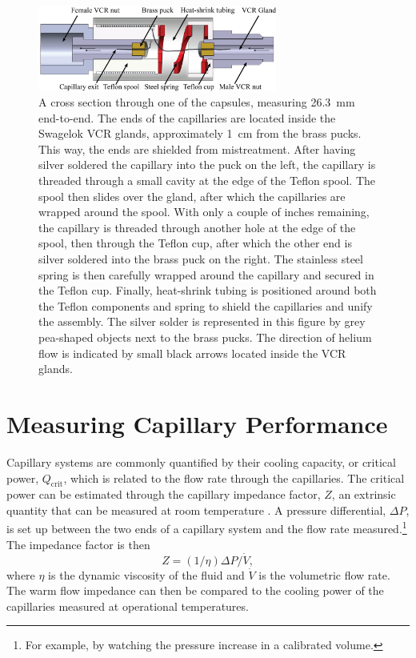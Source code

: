\documentclass[
12pt, %
letterpaper, %
oneside, %
headinclude, footinclude, %
BCOR5mm, %
]{scrartcl}
\newcommand{\mrm}[1]{\mathrm{#1}}
\begin{document}
\begin{figure}[tb]
\begin{center}
\includegraphics[width = 0.7\textwidth]{img/capillary_cross7.png}
\end{center}
\caption[A cross section through a capsule]{A cross section
  through one of the capsules, measuring 26.3~mm end-to-end. 
  The ends of the capillaries are located
  inside the Swagelok VCR glands, approximately 1~cm from the brass
  pucks. This way, the ends are shielded from mistreatment. After
  having silver soldered the capillary into the puck on the left, the
  capillary is threaded through a small cavity at the edge of the Teflon
  spool. The spool then slides over the gland, after which the
  capillaries are wrapped around the spool. With only a couple of
  inches remaining, the capillary is threaded through another hole at
  the edge of the spool, then through the Teflon cup, after which the
  other end is silver soldered into the brass puck on the right. The
  stainless steel spring is then carefully wrapped around the
  capillary and secured in the Teflon cup. Finally, heat-shrink tubing
  is positioned around both the Teflon components and spring to shield
  the capillaries and unify the assembly. The silver solder is represented
  in this figure by grey pea-shaped objects next to the brass pucks. 
  The direction of helium flow is indicated by small black arrows 
  located inside the VCR glands. 
  }
\label{fig:cap_cross}
\end{figure}


\section{Measuring Capillary Performance}
\label{sec:fund}

Capillary systems are commonly quantified by their cooling capacity, or critical power, $Q_\mrm{crit}$, which is related to the flow rate through the capillaries. The critical power can be estimated through the capillary impedance factor, $Z$, an extrinsic quantity that can be measured at room temperature \cite{Delong1970}. A pressure differential, $\Delta P$, is set up between the two ends of a capillary system and the flow rate measured.\footnote{For example, by watching the pressure increase in a calibrated volume.} The impedance factor is then
\begin{equation}
Z = (1/\eta)\Delta P / \dot{V},
\label{eq:Z}
\end{equation}
where $\eta$ is the dynamic viscosity of the fluid and $\dot{V}$ is the volumetric flow rate. The warm flow impedance can then be compared to the cooling power of the capillaries measured at operational temperatures. 
\end{document}
